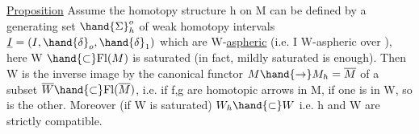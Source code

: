 \uline{Proposition} Assume the homotopy structure h on M can be defined by a
generating set $\hand{\Sigma}_h^o$ of weak homotopy intervals $\underline{I} =(I,\hand{\delta}_o,\hand{\delta}_1)$ which are
W-\uline{aspheric} (i.e. I W-aspheric over  ), here W $\hand{\subset} \mathrm{Fl}(M)$ is  saturated 
(in fact, mildly saturated is enough). Then W is the inverse image 
by the canonical functor $M \hand{\to} M_h = \overline{M}$ of a  subset $\overline{W} \hand{\subset} \mathrm{Fl}(\overline{M})$, i.e.
 if f,g are homotopic arrows in M, if one is in W, so is the
other. Moreover (if W is saturated) $W_h \hand{\subset} W$ i.e. h and W are strictly
compatible.

